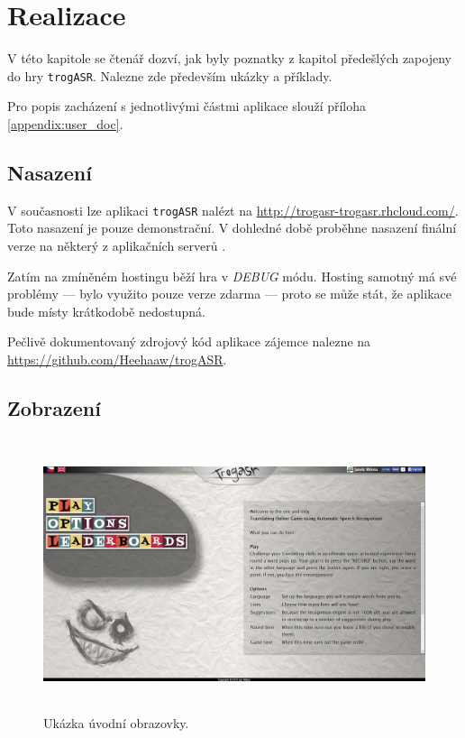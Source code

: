 \chapter{Realizace}

V této kapitole se čtenář dozví, jak byly poznatky z kapitol předešlých zapojeny do hry \verb|trogASR|. Nalezne zde především ukázky a příklady.

Pro popis zacházení s jednotlivými částmi aplikace slouží příloha \ref{appendix:user_doc}.

\section{Nasazení}

V současnosti lze aplikaci \verb|trogASR| nalézt na \url{http://trogasr-trogasr.rhcloud.com/}. Toto nasazení je pouze demonstrační. V dohledné době proběhne nasazení finální verze na některý z aplikačních serverů .

Zatím na zmíněném hostingu běží hra v {\sl DEBUG} módu. Hosting samotný má své problémy --- bylo využito pouze verze zdarma --- proto se může stát, že aplikace bude místy krátkodobě nedostupná.

Pečlivě dokumentovaný zdrojový kód aplikace zájemce nalezne na \url{https://github.com/Heehaaw/trogASR}.

\section{Zobrazení}

\begin{figure}[h]
	\centering
	\includegraphics[width=140mm,height=80mm]{img/title_screen.jpg}
	\caption{Ukázka úvodní obrazovky.}
	\label{fig:title}
\end{figure}

